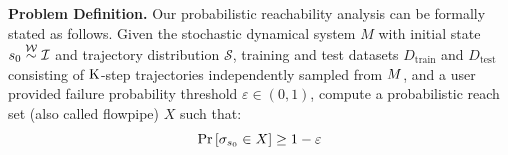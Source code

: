  \textbf{Problem Definition.} Our probabilistic reachability analysis can be formally stated as follows. Given the stochastic dynamical system $M$ with initial state $s_0 \stackrel{\mathcal{W}}{\sim} \mathcal{I}$ and trajectory distribution $\mathcal{S}$, training and test datasets $D_{\text{train}}$ and $D_{\text{test}}$ consisting  of $\mathrm{K}$-step trajectories independently sampled from $M$,  and a  user provided failure probability threshold $\varepsilon \in (0,1)$, compute a probabilistic reach set (also called flowpipe) $X$ such that:
\begin{equation}\label{eq:verific_prob}
 \Pr\left[ \sigma_{s_0} \in X \right]  \geq  1-\varepsilon
\end{equation}

